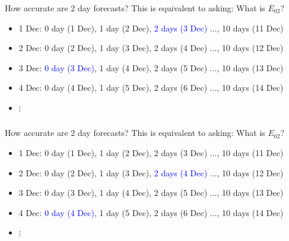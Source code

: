 \documentclass[aspectratio=169]{beamer}
\begin{document}
\begin{frame}
\frametitle{}

How accurate are 2 day forecasts? This is equivalent to asking:  What is $E_{02}$?
\begin{itemize}
\item 1 Dec: 0 day (1 Dec), 1 day (2 Dec), \textcolor{blue}{2 days (3 Dec)} $\ldots$, 10 days (11 Dec)
\item 2 Dec: 0 day (2 Dec), 1 day (3 Dec), 2 days (4 Dec) $\ldots$, 10 days (12 Dec)
\item 3 Dec: \textcolor{blue}{0 day (3 Dec)}, 1 day (4 Dec), 2 days (5 Dec) $\ldots$, 10 days (13 Dec)
\item 4 Dec: 0 day (4 Dec), 1 day (5 Dec), 2 days (6 Dec) $\ldots$, 10 days (14 Dec)
\item $\vdots$
\end{itemize}

\end{frame}
\begin{frame}
\frametitle{}

How accurate are 2 day forecasts? This is equivalent to asking:  What is $E_{02}$?
\begin{itemize}
\item 1 Dec: 0 day (1 Dec), 1 day (2 Dec), 2 days (3 Dec) $\ldots$, 10 days (11 Dec)
\item 2 Dec: 0 day (2 Dec), 1 day (3 Dec), \textcolor{blue}{2 days (4 Dec)} $\ldots$, 10 days (12 Dec)
\item 3 Dec: 0 day (3 Dec), 1 day (4 Dec), 2 days (5 Dec) $\ldots$, 10 days (13 Dec)
\item 4 Dec: \textcolor{blue}{0 day (4 Dec)}, 1 day (5 Dec), 2 days (6 Dec) $\ldots$, 10 days (14 Dec)
\item $\vdots$
\end{itemize}

\end{frame}
\end{document}
